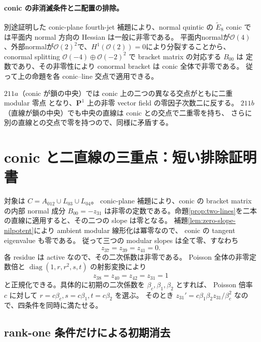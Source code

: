 \documentclass[11pt,a4paper]{ltjsarticle}
\newcommand{\PP}{\mathbf P}\renewcommand{\AA}{\mathbf A}
\newcommand{\OO}{\mathcal O}\newcommand{\FF}{\mathcal F}
\theoremstyle{remark}\newtheorem{remark}[theorem]{注意}
\begin{document}
\paragraph{conic の非消滅条件と二配置の排除。}
別途証明した conic-plane fourth-jet 補題により、normal quintic の $\widetilde E_8$ conic
では平面内 normal 方向の Hessian は一般に非零である。
平面内normalが$\OO(4)$、外部normalが$\OO(2)^2$で、$H^1(\OO(2))=0$により分裂することから、conormal splitting $\OO(-4)\oplus\OO(-2)^2$ で bracket matrix の対応する $B_{00}$ は
定数であり、その非零性により conormal bracket は conic 全体で非零である。
従って上の命題を各 conic--line 交点で適用できる。

$211a$（conic が鎖の中央）では conic 上の二つの異なる交点がともに二重 modular 零点
となり、$\PP^1$ 上の非零 vector field の零因子次数二に反する。
$211b$（直線が鎖の中央）でも中央の直線は conic との交点で二重零を持ち、
さらに別の直線との交点で零を持つので、同様に矛盾する。


\section{conic と二直線の三重点：短い排除証明書}

対象は $C=A_{012}\cup L_{03}\cup L_{04}$。
conic-plane 補題により、conic の bracket matrix の内部 normal 成分
$B_{00}=-z_{31}$ は非零の定数である。命題\ref{prop:two-lines}を二本の直線に適用すると、その二つの slope は零となる。
補題\ref{lem:zero-slope-nilpotent}により ambient modular 線形化は冪零なので、
conic の tangent eigenvalue も零である。
従って三つの modular slopes は全て零、すなわち
\[
z_{37}=z_{39}=z_{41}=0.
\]
各 residue は active なので、その二次係数は非零である。
Poisson 全体の非零定数倍と $\operatorname{diag}(1,r,r^2,s,t)$ の射影変換により
\[
z_{38}=z_{40}=z_{42}=z_{31}=1
\]
と正規化できる。具体的に初期の二次係数を $\beta_c,\beta_1,\beta_2$ とすれば、
Poisson 倍率 $c$ に対して $r=c\beta_c,s=c\beta_1,t=c\beta_2$ を選ぶ。
そのとき $z_{31}'=c\beta_1\beta_2 z_{31}/\beta_c^2$ なので、四条件を同時に満たせる。

\subsection{rank-one 条件だけによる初期消去}
\end{document}
